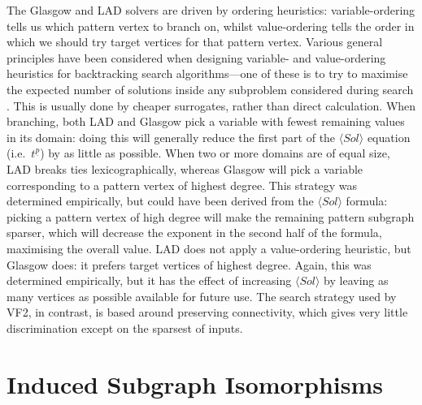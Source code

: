 \documentclass[twoside,11pt]{article}
\begin{document}
The Glasgow and LAD solvers are driven by ordering heuristics: variable-ordering tells us which
pattern vertex to branch on, whilst value-ordering tells the order in which we should try target
vertices for that pattern vertex.
Various general principles have been considered when designing variable- and value-ordering
heuristics for backtracking search algorithms---one of these is to try to maximise the expected
number of solutions inside any subproblem considered during search \cite{DBLP:conf/cp/GentMPSW96}.
This is usually done by cheaper surrogates, rather than direct calculation. When branching, both LAD
and Glasgow pick a variable with fewest remaining values in its domain: doing this will generally
reduce the first part of the $\langle Sol \rangle$ equation (i.e.\ $t^{\underline{p}}$) by as little
as possible.  When two or more domains are of equal size, LAD breaks ties lexicographically, whereas
Glasgow will pick a variable corresponding to a pattern vertex of highest degree. This strategy was
determined empirically, but could have been derived from the $\langle Sol \rangle$ formula: picking
a pattern vertex of high degree will make the remaining pattern subgraph sparser, which will
decrease the exponent in the second half of the formula, maximising the overall value. LAD does not
apply a value-ordering heuristic, but Glasgow does: it prefers target vertices of highest degree.
Again, this was determined empirically, but it has the effect of increasing $\langle Sol \rangle$ by
leaving as many vertices as possible available for future use. The search strategy used by VF2, in
contrast, is based around preserving connectivity, which gives very little discrimination except on
the sparsest of inputs.

\section{Induced Subgraph Isomorphisms}\label{section:induced}
\end{document}
